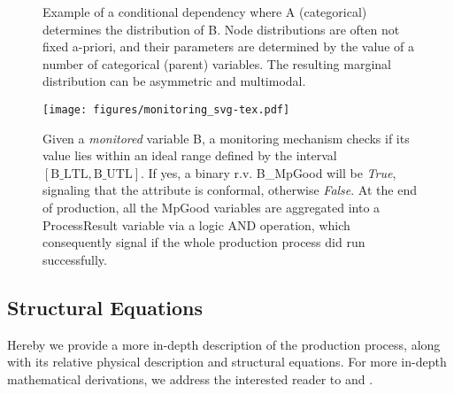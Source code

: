 \begin{figure}{
\centering
{}}
\caption{Example of a conditional dependency where A (categorical) determines the distribution of B. Node distributions are often not fixed a-priori, and their parameters are determined by the value of a number of categorical (parent) variables. The resulting marginal distribution can be asymmetric and multimodal.}\label{fig:second_order_uncertainty}
\texttt{[image: figures/monitoring\_svg-tex.pdf]}
\caption{Given a \textit{monitored} variable B, a monitoring mechanism checks if its value lies within an ideal range defined by the interval $\left[\text{B\_LTL}, \text{B\_UTL}\right]$. If yes, a binary r.v. B\_MpGood will be \textit{True}, signaling that the attribute is conformal, otherwise \textit{False}. At the end of production, all the MpGood variables are aggregated into a ProcessResult variable via a logic AND operation, which consequently signal if the whole production process did run successfully.}\label{fig:monitoring}
\end{figure}

\subsection{Structural Equations} \label{appendix:structural_equations}

Hereby we provide a more in-depth description of the production process, along with its relative physical description and structural equations. For more in-depth mathematical derivations, we address the interested reader to \cite{budynas2008shigley} and \cite{Eslami2013TheoryOE}. 

